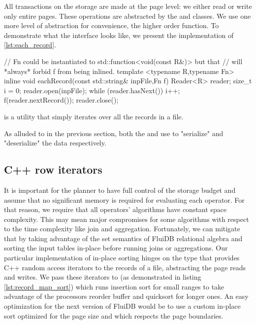 All transactions on the storage are made at the page level: we
either read or write only entire pages. These operations are
abstracted by the  and  classes. We use one more level
of abstraction for convenience, the higher order 
function. To demonstrate what the interface looks like, we present the
implementation of  \ref{lst:each_record}.

\begin{code}
\begin{cppcode}
// Fn could be instantiated to std::function<void(const R&)> but that
// will *always* forbid f from being inlined.
template <typename R,typename Fn>
inline void eachRecord(const std::string& inpFile,Fn f) {
  Reader<R> reader;
  size_t i = 0;
  reader.open(inpFile);
  while (reader.hasNext()) {
    i++;
    f(reader.nextRecord());
  }
  reader.close();
}
\end{cppcode}
\caption{\label{lst:each_record} is a utility that simply iterates over all the records in a file.}
\end{code}

As alluded to in the previous section, both the  and 
use  to "serialize" and "deserialize" the data
respectively.

\subsection{C++ row iterators}

It is important for the planner to have full control of the storage
budget and assume that no significant memory is required for
evaluating each operator. For that reason, we require that all
operators' algorithms have constant space complexity. This may mean
major compromises for some algorithms with respect to the time
complexity like join and aggregation. Fortunately, we can mitigate
that by taking advantage of the set semantics of FluiDB relational
algebra and sorting the input tables in-place before running joins or
aggregations. Our particular implementation of in-place sorting hinges
on the  type that provides C++ random access iterators
to the records of a file, abstracting the page reads and writes. We
pass these iterators to  (as demonstrated in listing
\ref{lst:record_map_sort}) which runs insertion sort for small ranges
to take advantage of the processors reorder buffer and quicksort for
longer ones. An easy optimization for the next version of FluiDB would
be to use a custom in-place sort optimized for the page size and which
respects the page boundaries.

